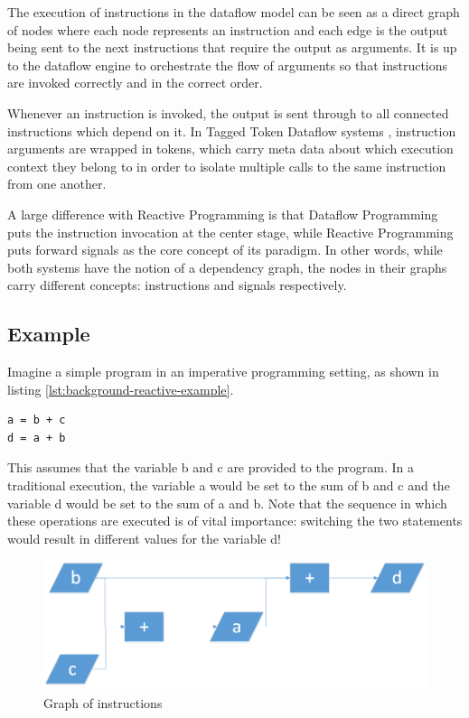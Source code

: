 The execution of instructions in the dataflow model can be seen as a direct graph of nodes where each node represents an instruction and each edge is the output being sent to the next instructions that require the output as arguments. It is up to the dataflow engine to orchestrate the flow of arguments so that instructions are invoked correctly and in the correct order.

Whenever an instruction is invoked, the output is sent through to all connected instructions which depend on it. In Tagged Token Dataflow systems \citep{arvind_executing_1990}, instruction arguments are wrapped in tokens, which carry meta data about which execution context they belong to in order to isolate multiple calls to the same instruction from one another.

A large difference with Reactive Programming is that Dataflow Programming puts the instruction invocation at the center stage, while Reactive Programming puts forward signals as the core concept of its paradigm. In other words, while both systems have the notion of a dependency graph, the nodes in their graphs carry different concepts: instructions and signals respectively.
 
\newpage

\subsection{Example}

Imagine a simple program in an imperative programming setting, as shown in listing \ref{lst:background-reactive-example}.

\begin{lstlisting}[caption={A basic data flow program},captionpos=b,label={lst:background-dataflow-example}]
a = b + c
d = a + b
\end{lstlisting}

This assumes that the variable b and c are provided to the program.
In a traditional execution, the variable a would be set to the sum of b and c and the variable d would be set to the sum of a and b. Note that the sequence in which these operations are executed is of vital importance: switching the two statements would result in different values for the variable d!

\begin{figure}[ht]
    \centerline{\includegraphics[width=\textwidth]{images/background-dataflow-example.png}}
	\caption{Graph of instructions}
	\label{fig:background-dataflow-example}
\end{figure}

